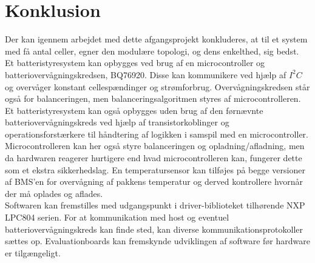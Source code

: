 \chapter{Konklusion} \label{kap:konklusion}
Der kan igennem arbejdet med dette afgangsprojekt konkluderes, at til et system med få antal celler, egner den modulære topologi, og dens enkelthed, sig bedst. \\

Et batteristyresystem kan opbygges ved brug af en microcontroller og batteriovervågningskredsen, BQ76920. Disse kan kommunikere ved hjælp af $I^2C$ og overvåger konstant cellespændinger og strømforbrug. Overvågningskredsen står også for balanceringen, men balanceringsalgoritmen styres af microcontrolleren. \\

Et batteristyresystem kan også opbygges uden brug af den førnævnte batteriovervågningskreds ved hjælp af transistorkoblinger og operationsforstærkere til håndtering af logikken i samspil med en microcontroller. Microcontrolleren kan her også styre balanceringen og opladning/afladning, men da hardwaren reagerer hurtigere end hvad microcontrolleren kan, fungerer dette som et ekstra sikkerhedslag. En temperatursensor kan tilføjes på begge versioner af BMS'en for overvågning af pakkens temperatur og derved kontrollere hvornår der må oplades og aflades. \\

Softwaren kan fremstilles med udgangspunkt i driver-biblioteket tilhørende NXP LPC804 serien. For at kommunikation med host og eventuel batteriovervågningskreds kan finde sted, kan diverse kommunikationsprotokoller sættes op. Evaluationboards kan fremskynde udviklingen af software før hardware er tilgængeligt. 